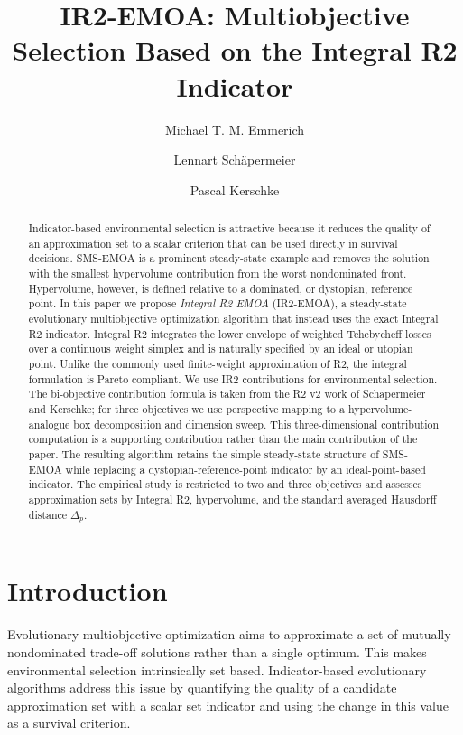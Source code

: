 \documentclass[runningheads]{llncs}
\title{IR2-EMOA: Multiobjective Selection Based on the Integral R2 Indicator}
\author{Michael T. M. Emmerich\inst{1} \and
Lennart Sch\"apermeier\inst{2} \and
Pascal Kerschke\inst{2}}
\institute{Faculty of Information Technology, University of Jyv\"askyl\"a, Jyv\"askyl\"a, Finland
\and
TU Dresden, Dresden, Germany\\
\email{\{lennart.schaepermeier,pascal.kerschke\}@tu-dresden.de}}
\begin{document}
\maketitle

\begin{abstract}
Indicator-based environmental selection is attractive because it reduces the quality of an approximation set to a scalar criterion that can be used directly in survival decisions. SMS-EMOA is a prominent steady-state example and removes the solution with the smallest hypervolume contribution from the worst nondominated front. Hypervolume, however, is defined relative to a dominated, or dystopian, reference point. In this paper we propose \emph{Integral R2 EMOA} (IR2-EMOA), a steady-state evolutionary multiobjective optimization algorithm that instead uses the exact Integral R2 indicator. Integral R2 integrates the lower envelope of weighted Tchebycheff losses over a continuous weight simplex and is naturally specified by an ideal or utopian point. Unlike the commonly used finite-weight approximation of R2, the integral formulation is Pareto compliant. We use IR2 contributions for environmental selection. The bi-objective contribution formula is taken from the R2 v2 work of Sch\"apermeier and Kerschke; for three objectives we use perspective mapping to a hypervolume-analogue box decomposition and dimension sweep. This three-dimensional contribution computation is a supporting contribution rather than the main contribution of the paper. The resulting algorithm retains the simple steady-state structure of SMS-EMOA while replacing a dystopian-reference-point indicator by an ideal-point-based indicator. The empirical study is restricted to two and three objectives and assesses approximation sets by Integral R2, hypervolume, and the standard averaged Hausdorff distance $\Delta_p$.
\end{abstract}

\section{Introduction}
\label{sec:introduction}

Evolutionary multiobjective optimization aims to approximate a set of mutually nondominated trade-off solutions rather than a single optimum. This makes environmental selection intrinsically set based. Indicator-based evolutionary algorithms address this issue by quantifying the quality of a candidate approximation set with a scalar set indicator and using the change in this value as a survival criterion.
\end{document}

